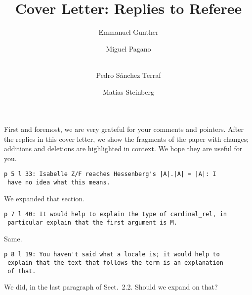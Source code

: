 \documentclass[runningheads]{llncs}
\begin{document}
%
\title{Cover Letter: Replies to Referee
}
%
%
\author{Emmanuel Gunther \and
Miguel Pagano \and \\
Pedro Sánchez Terraf%
\and
Matías Steinberg
}
%
%
%
\maketitle              %
%
First and foremost, we are very grateful for your comments and
pointers. After the replies in this cover letter, we show the
fragments of the paper with changes; additions and deletions are
highlighted in context. We hope they are useful for you.

\begin{verbatim}
p 5 l 33: Isabelle Z/F reaches Hessenberg's |A|.|A| = |A|: I
 have no idea what this means.
\end{verbatim}

We expanded that section.

\begin{verbatim}
p 7 l 40: It would help to explain the type of cardinal_rel, in
 particular explain that the first argument is M.
\end{verbatim}

Same.

\begin{verbatim}
p 8 l 19: You haven't said what a locale is; it would help to
 explain that the text that follows the term is an explanation
 of that.
\end{verbatim}

We did, in the last paragraph of Sect.~2.2. Should we expand on
that?
\end{document}
